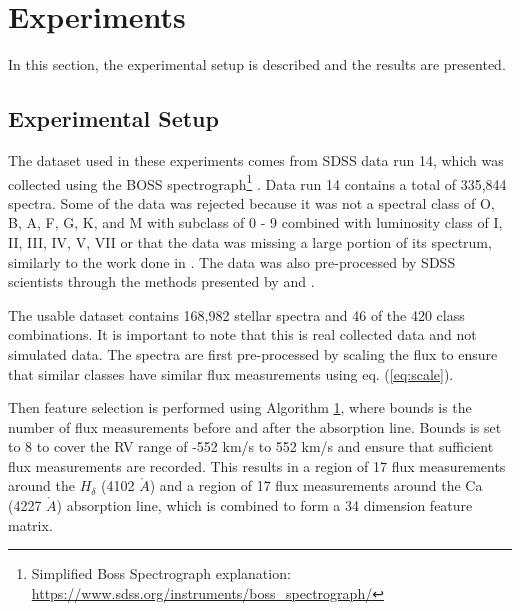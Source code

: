 \documentclass[trackchanges, floatfix, twocolumn, tighten]{aastex62}
\newcommand{\RomanNumeralCaps}[1] {\MakeUppercase{\romannumeral #1}}
\begin{document}
\section{Experiments}\label{sec:exp}

In this section, the experimental setup is described and the results are presented.

\subsection{Experimental Setup}

The dataset used in these experiments comes from SDSS data run 14, which was collected using the BOSS spectrograph\footnote{Simplified Boss Spectrograph explanation: \url{https://www.sdss.org/instruments/boss_spectrograph/}} \citep{Smee}. Data run 14 contains a total of 335,844 spectra. Some of the data was rejected because it was not a spectral class of O, B, A, F, G, K, and M with subclass of 0 - 9 combined with luminosity class of I, II, III, IV, V, VII or that the data was missing a large portion of its spectrum, similarly to the work done in \cite{brice}. The data was also pre-processed by SDSS scientists through the methods presented by \cite{Dawson} and \cite{Stoughton}.

The usable dataset contains 168,982 stellar spectra and 46 of the 420 class combinations. It is important to note that this is real collected data and not simulated data. The spectra are first pre-processed by scaling the flux to ensure that similar classes have similar flux measurements using eq. (\ref{eq:scale}).

Then feature selection is performed using Algorithm \hyperlink{alg:FS}{1}, where bounds is the number of flux measurements before and after the absorption line. Bounds is set to 8 to cover the RV range of -552 km/s to 552 km/s and ensure that sufficient flux measurements are recorded. This results in a region of 17 flux measurements around the $H_\delta$ (4102 $\mathring{A}$) and a region of 17 flux measurements around the Ca \RomanNumeralCaps{1} (4227 $\mathring{A}$) absorption line, which is combined to form a 34 dimension feature matrix.
\end{document}
